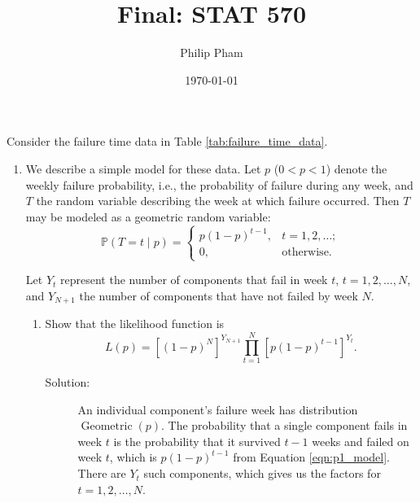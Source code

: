 \documentclass[letterpaper,11pt]{article}
\title{Final: STAT 570}
\author{Philip Pham}
\date{\today}
\begin{document}
\maketitle

Consider the failure time data in Table \ref{tab:failure_time_data}.

\begin{enumerate}
\item We describe a simple model for these data. Let $p$ ($0 < p < 1$) denote
  the weekly failure probability, i.e., the probability of failure during any
  week, and $T$ the random variable describing the week at which failure
  occurred. Then $T$ may be modeled as a geometric random variable:
  \begin{equation}
    \mathbb{P}\left(T = t \mid p\right)
    = \begin{cases}
      p\left(1-p\right)^{t-1}, &t=1,2,\ldots; \\
      0,&\text{otherwise}.      
    \end{cases}
    \label{eqn:p1_model}
  \end{equation}

  Let $Y_t$ represent the number of components that fail in week $t$,
  $t = 1,2,\ldots,N$, and $Y_{N+1}$ the number of components that have not failed
  by week $N$.

  \begin{enumerate}
  \item Show that the likelihood function is
    \begin{equation}
      L\left(p\right) =
      \left[\left(1 - p\right)^N\right]^{Y_{N+1}}
      \prod_{t=1}^N\left[
        p\left(1 - p\right)^{t-1}
      \right]^{Y_t}.
      \label{eqn:p1_likelihood}
    \end{equation}
    \begin{description}
    \item[Solution:] An individual component's failure week has distribution
      $\operatorname{Geometric}\left(p\right)$. The probability that a single
      component fails in week $t$ is the probability that it survived $t - 1$
      weeks and failed on week $t$, which is $p\left(1 - p\right)^{t-1}$ from
      Equation \ref{eqn:p1_model}. There are $Y_t$ such components, which gives
      us the factors for $t = 1,2,\ldots,N$.


\end{description}
\end{enumerate}
\end{enumerate}
\end{document}
